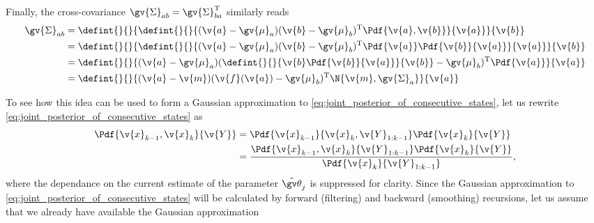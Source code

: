 Finally, the cross-covariance $\gv{\Sigma}_{ab}=\gv{\Sigma}_{ba}^\tr$ similarly reads
\begin{align}
	\gv{\Sigma}_{ab}&=\defint{}{}{\defint{}{}{(\v{a}-\gv{\mu}_a)(\v{b}-\gv{\mu}_b)^\tr\Pdf{\v{a},\v{b}}}{\v{a}}}{\v{b}} \nonumber\\
	&=\defint{}{}{\defint{}{}{(\v{a}-\gv{\mu}_a)(\v{b}-\gv{\mu}_b)^\tr\Pdf{\v{a}}\Pdf{\v{b}}{\v{a}}}{\v{a}}}{\v{b}} \nonumber\\
	&=\defint{}{}{(\v{a}-\gv{\mu}_a)(\defint{}{}{\v{b}\Pdf{\v{b}}{\v{a}}}{\v{b}}-\gv{\mu}_b)^\tr\Pdf{\v{a}}}{\v{a}} \nonumber\\
	&=\defint{}{}{(\v{a}-\v{m})(\v{f}(\v{a})-\gv{\mu}_b)^\tr\N{\v{m},\gv{\Sigma}_a}}{\v{a}}\label{eq:cross_cov_int}
\end{align}


 
To see how this idea can be used to form a Gaussian
approximation to \eqref{eq:joint_posterior_of_consecutive_states}, let us
rewrite \eqref{eq:joint_posterior_of_consecutive_states} as
\begin{align}
\begin{split}
	\Pdf{\v{x}_{k-1},\v{x}_{k}}{\v{Y}}&=\Pdf{\v{x}_{k-1}}{\v{x}_{k},\v{Y}_{1:k-1}}\Pdf{\v{x}_{k}}{\v{Y}}\\
	&=\frac{\Pdf{\v{x}_{k-1},\v{x}_{k}}{\v{Y}_{1:k-1}}\Pdf{\v{x}_{k}}{\v{Y}}}{\Pdf{\v{x}_{k}}{\v{Y}_{1:k-1}}},
	\label{eq:joint_smooth}
\end{split}
\end{align}
where the dependance on the current estimate of the parameter $\hat{\Th}_j$
is suppressed for clarity. Since the Gaussian approximation to
\eqref{eq:joint_posterior_of_consecutive_states} will be calculated by forward
(filtering) and backward (smoothing) recursions, let us assume that we already
have available the Gaussian approximation

